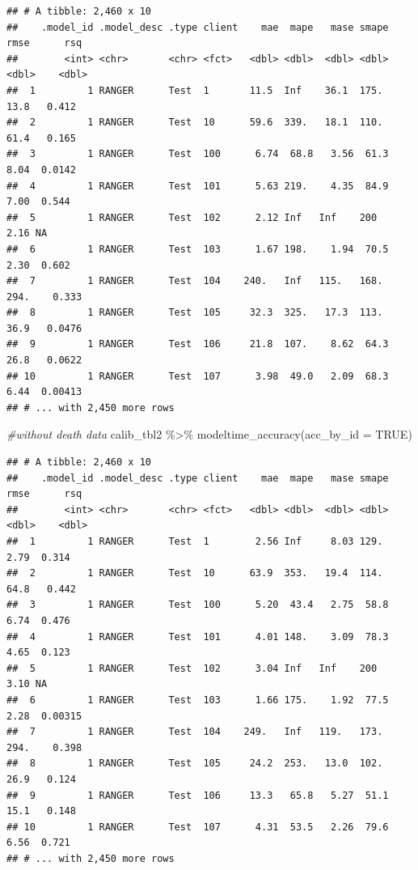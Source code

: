 \documentclass[
]{article}
\newenvironment{Shaded}{\begin{snugshade}}{\end{snugshade}}
\newcommand{\AttributeTok}[1]{\textcolor[rgb]{0.77,0.63,0.00}{#1}}
\newcommand{\CommentTok}[1]{\textcolor[rgb]{0.56,0.35,0.01}{\textit{#1}}}
\newcommand{\ConstantTok}[1]{\textcolor[rgb]{0.00,0.00,0.00}{#1}}
\newcommand{\FunctionTok}[1]{\textcolor[rgb]{0.00,0.00,0.00}{#1}}
\newcommand{\NormalTok}[1]{#1}
\newcommand{\SpecialCharTok}[1]{\textcolor[rgb]{0.00,0.00,0.00}{#1}}
\begin{document}
\begin{verbatim}
## # A tibble: 2,460 x 10
##    .model_id .model_desc .type client    mae  mape   mase smape   rmse      rsq
##        <int> <chr>       <chr> <fct>   <dbl> <dbl>  <dbl> <dbl>  <dbl>    <dbl>
##  1         1 RANGER      Test  1       11.5  Inf    36.1  175.   13.8   0.412  
##  2         1 RANGER      Test  10      59.6  339.   18.1  110.   61.4   0.165  
##  3         1 RANGER      Test  100      6.74  68.8   3.56  61.3   8.04  0.0142 
##  4         1 RANGER      Test  101      5.63 219.    4.35  84.9   7.00  0.544  
##  5         1 RANGER      Test  102      2.12 Inf   Inf    200     2.16 NA      
##  6         1 RANGER      Test  103      1.67 198.    1.94  70.5   2.30  0.602  
##  7         1 RANGER      Test  104    240.   Inf   115.   168.  294.    0.333  
##  8         1 RANGER      Test  105     32.3  325.   17.3  113.   36.9   0.0476 
##  9         1 RANGER      Test  106     21.8  107.    8.62  64.3  26.8   0.0622 
## 10         1 RANGER      Test  107      3.98  49.0   2.09  68.3   6.44  0.00413
## # ... with 2,450 more rows
\end{verbatim}

\begin{Shaded}
\begin{Highlighting}[]
\CommentTok{\#without death data}
\NormalTok{calib\_tbl2 }\SpecialCharTok{\%\textgreater{}\%} 
    \FunctionTok{modeltime\_accuracy}\NormalTok{(}\AttributeTok{acc\_by\_id =} \ConstantTok{TRUE}\NormalTok{)}
\end{Highlighting}
\end{Shaded}

\begin{verbatim}
## # A tibble: 2,460 x 10
##    .model_id .model_desc .type client    mae  mape   mase smape   rmse      rsq
##        <int> <chr>       <chr> <fct>   <dbl> <dbl>  <dbl> <dbl>  <dbl>    <dbl>
##  1         1 RANGER      Test  1        2.56 Inf     8.03 129.    2.79  0.314  
##  2         1 RANGER      Test  10      63.9  353.   19.4  114.   64.8   0.442  
##  3         1 RANGER      Test  100      5.20  43.4   2.75  58.8   6.74  0.476  
##  4         1 RANGER      Test  101      4.01 148.    3.09  78.3   4.65  0.123  
##  5         1 RANGER      Test  102      3.04 Inf   Inf    200     3.10 NA      
##  6         1 RANGER      Test  103      1.66 175.    1.92  77.5   2.28  0.00315
##  7         1 RANGER      Test  104    249.   Inf   119.   173.  294.    0.398  
##  8         1 RANGER      Test  105     24.2  253.   13.0  102.   26.9   0.124  
##  9         1 RANGER      Test  106     13.3   65.8   5.27  51.1  15.1   0.148  
## 10         1 RANGER      Test  107      4.31  53.5   2.26  79.6   6.56  0.721  
## # ... with 2,450 more rows
\end{verbatim}
\end{document}
